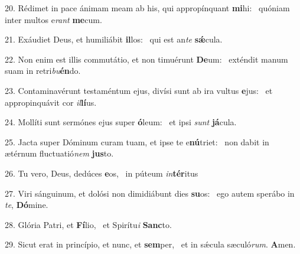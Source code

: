 20. Rédimet in pace ánimam meam ab his, qui appropínquant \textbf{mi}hi: \ast\  quóniam inter multos e\textit{rant} \textbf{me}cum.\

21. Exáudiet Deus, et humiliábit \textbf{il}los: \ast\  qui est an\textit{te} \textbf{sǽ}cula.\

22. Non enim est illis commutátio, et non timuérunt \textbf{De}um: \ast\  exténdit manum suam in retri\textit{bu}\textbf{én}do.\

23. Contaminavérunt testaméntum ejus, divísi sunt ab ira vultus \textbf{e}jus: \ast\  et appropinquávit cor \textit{il}\textbf{lí}us.\

24. Mollíti sunt sermónes ejus super \textbf{ó}leum: \ast\  et ipsi \textit{sunt} \textbf{já}cula.\

25. Jacta super Dóminum curam tuam, et ipse te e\textbf{nú}triet: \ast\  non dabit in ætérnum fluctuatió\textit{nem} \textbf{jus}to.\

26. Tu vero, Deus, dedúces \textbf{e}os, \ast\  in púteum \textit{in}\textbf{tér}itus\

27. Viri sánguinum, et dolósi non dimidiábunt dies \textbf{su}os: \ast\  ego autem sperábo in \textit{te}, \textbf{Dó}mine.\

28. Glória Patri, et \textbf{Fí}lio, \ast\  et Spirítu\textit{i} \textbf{Sanc}to.\

29. Sicut erat in princípio, et nunc, et \textbf{sem}per, \ast\  et in sǽcula sæculó\textit{rum}. \textbf{A}men.\

